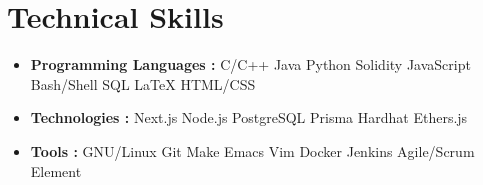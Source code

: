 \documentclass[letterpaper, 11pt]{article}
\newcommand{\technicalskill}[3] {
  \vspace{-1pt}
\item\small
  #1 \textbf{#2 : }{\footnotesize{#3}}
  \vspace{-2pt}
}
\begin{document}
\section{Technical Skills}
\begin{itemize}[leftmargin=*]
  \technicalskill
  {}{Programming Languages}
  {C/C++ \textbar{} Java \textbar{} Python \textbar{} Solidity \textbar{} JavaScript \textbar{} Bash/Shell \textbar{} SQL \textbar{} \LaTeX{} \textbar{} HTML/CSS}

  \technicalskill
  {}{Technologies}
  {Next.js \textbar{} Node.js \textbar{} PostgreSQL \textbar{} Prisma \textbar{} Hardhat \textbar{} Ethers.js}

  \technicalskill
  {}{Tools}
  {GNU/Linux \textbar{} Git \textbar{} Make \textbar{} Emacs \textbar{} Vim \textbar{} Docker \textbar{} Jenkins \textbar{} Agile/Scrum \textbar{} Element}
\end{itemize}
\end{document}
